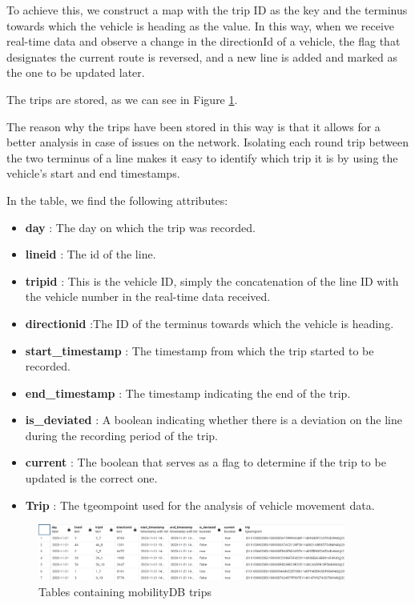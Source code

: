 \documentclass[12pt]{report}
\begin{document}
	To achieve this, we construct a map with the trip ID as the key and the terminus towards which the vehicle is heading as the value. In this way, when we receive real-time data and observe a change in the directionId of a vehicle, the flag that designates the current route is reversed, and a new line is added and marked as the one to be updated later.
	
	
	The trips are stored, as we can see in Figure \ref{table_trips}. 
	
	The reason why the trips have been stored in this way is that it allows for a better analysis in case of issues on the network. Isolating each round trip between the two terminus of a line makes it easy to identify which trip it is by using the vehicle's start and end timestamps.
	
	
	In the table, we find the following attributes: 
	
	\begin{itemize}[noitemsep]
		\item \textbf{day} : The day on which the trip was recorded.
		\item \textbf{lineid} : The id of the line.
		\item \textbf{tripid} : This is the vehicle ID, simply the concatenation of the line ID with the vehicle number in the real-time data received.
		\item \textbf{directionid} :The ID of the terminus towards which the vehicle is heading.
		\item \textbf{start\_timestamp} : The timestamp from which the trip started to be recorded.
		\item \textbf{end\_timestamp} : The timestamp indicating the end of the trip.
		\item \textbf{is\_deviated} : A boolean indicating whether there is a deviation on the line during the recording period of the trip.
		\item \textbf{current} : The boolean that serves as a flag to determine if the trip to be updated is the correct one.
		\item \textbf{Trip} : The tgeompoint used for the analysis of vehicle movement data.
	\end{itemize}
	
	
	
	\begin{center}
		\begin{figure}
			\centering
			\includegraphics[width=0.9\textwidth]{images/stib_table_trips.png}
			\caption{Tables containing mobilityDB trips}
			\label{table_trips}
		\end{figure}
	\end{center}
	
\end{document}
